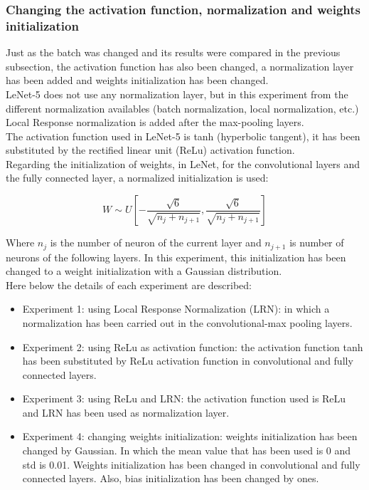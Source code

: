 \subsubsection{Changing the activation function, normalization and weights initialization}
Just as the batch was changed and its results were compared in the previous subsection, the activation function has also been changed, a normalization layer has been added and weights initialization has been changed.\\

LeNet-5 does not use any normalization layer, but in this experiment from the different normalization availables (batch normalization, local normalization, etc.) Local Response normalization is added after the max-pooling layers.\\

The activation function used in LeNet-5 is tanh (hyperbolic tangent), it has been substituted by the rectified linear unit (ReLu) activation function.\\

Regarding the initialization of weights, in LeNet, for the convolutional layers and the fully connected layer,  a normalized initialization \cite{XavierInitialization} is used:

\begin{equation}
  W \sim U [- \frac{\sqrt{6}}{\sqrt{n_{j}+n_{j+1}}},\frac{\sqrt{6}}{\sqrt{n_{j}+n_{j+1}}}]
\end{equation}

Where $n_{j}$ is the number of neuron of the current layer and $n_{j+1}$ is number of neurons of the following layers. In this experiment, this initialization has been changed to a weight initialization with a Gaussian distribution.\\

Here below the details of each experiment are described:
\begin{itemize}
\item{Experiment 1: using Local Response Normalization (LRN):} in which a normalization has been carried out in the convolutional-max pooling layers.
\item{Experiment 2: using ReLu as activation function:} the activation function tanh has been substituted by ReLu activation function in convolutional and fully connected layers.
\item{Experiment 3: using ReLu and LRN}: the activation function used is ReLu and LRN has been used as  normalization layer.
\item{Experiment 4: changing weights initialization}: weights initialization has been changed by Gaussian. In which the mean value that has been used is 0 and std is 0.01. Weights initialization has been changed in convolutional and fully connected layers. Also, bias initialization has been changed by ones.
\end{itemize}

